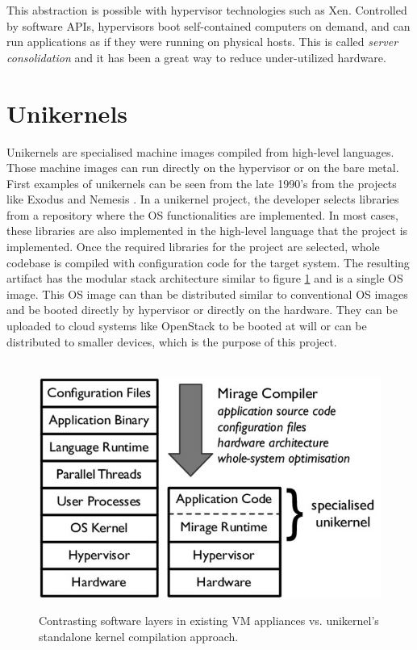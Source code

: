 This abstraction is possible with hypervisor technologies such as Xen. Controlled by software APIs, hypervisors boot self-contained computers on demand, and can run applications as if they were running on physical hosts. This is called \textit{server consolidation} and it has been a great way to reduce under-utilized hardware. 

\section{Unikernels}
Unikernels \cite{library-operating-system} \cite{madhavapeddy2014unikernels} are specialised machine images compiled from high-level languages. Those machine images can run directly on the hypervisor or on the bare metal. First examples of unikernels can be seen from the late 1990's from the projects like Exodus\cite{exokernel} and Nemesis \cite{nemesis}. In a unikernel project, the developer selects libraries from a repository where the OS functionalities are implemented. In most cases, these libraries are also implemented in the high-level language that the project is implemented. Once the required libraries for the project are selected, whole codebase is compiled with configuration code for the target system. The resulting artifact has the modular stack architecture similar to figure \ref{fig:unikernel-arch} and is a single OS image. This OS image can than be distributed similar to conventional OS images and be booted directly by hypervisor or directly on the hardware. They can be uploaded to cloud systems like OpenStack \cite{openstack} to be booted at will or can be distributed to smaller devices, which is the purpose of this project.

\begin{figure}[htpb]
  \
  \includegraphics[height=0.3\textwidth]{figures/Contrasting-software-layers-in-existing-VM-appliances-vs-unikernels-standalone-kernel_W640.jpg}
  \caption{ Contrasting software layers in existing VM appliances vs. unikernel’s standalone kernel compilation approach. \cite{library-operating-system}} \label{fig:unikernel-arch}
\end{figure}

